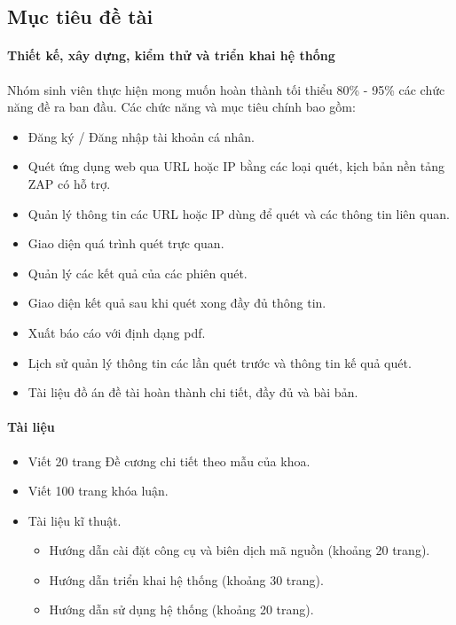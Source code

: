 \subsection*{Mục tiêu đề tài}
\paragraph{Thiết kế, xây dựng, kiểm thử và triển khai hệ thống}
\tab Nhóm sinh viên thực hiện mong muốn hoàn thành tối thiểu 80\% - 95\% các chức năng đề ra ban đầu. Các chức năng và mục tiêu chính bao gồm:
\begin{itemize}
    \item Đăng ký / Đăng nhập tài khoản cá nhân.
    \item Quét ứng dụng web qua URL hoặc IP bằng các loại quét, kịch bản nền tảng ZAP có hỗ trợ.
    \item Quản lý thông tin các URL hoặc IP dùng để quét và các thông tin liên quan.
    \item Giao diện quá trình quét trực quan.
    \item Quản lý các kết quả của các phiên quét.
    \item Giao diện kết quả sau khi quét xong đầy đủ thông tin.
    \item Xuất báo cáo với định dạng pdf.
    \item Lịch sử quản lý thông tin các lần quét trước và thông tin kế quả quét.
    \item Tài liệu đồ án đề tài hoàn thành chi tiết, đầy đủ và bài bản.
\end{itemize}
\paragraph{Tài liệu}
\begin{itemize}
    \item Viết 20 trang Đề cương chi tiết theo mẫu của khoa.
    \item Viết 100 trang khóa luận.
    \item Tài liệu kĩ thuật.
    \begin{itemize}
        \item Hướng dẫn cài đặt công cụ và biên dịch mã nguồn (khoảng 20 trang).
        \item Hướng dẫn triển khai hệ thống (khoảng 30 trang).
        \item Hướng dẫn sử dụng hệ thống (khoảng 20 trang).
    \end{itemize}
\end{itemize}